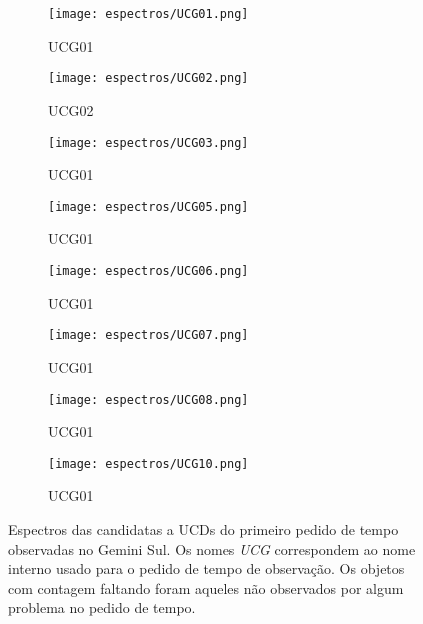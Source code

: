 \begin{figure}[!ht]
    \centering
    \captionsetup{justification=centering}
    \begin{subfigure}[b]{0.45\textwidth}
        \texttt{[image: espectros/UCG01.png]}
        \caption{UCG01}
    \end{subfigure}
    \begin{subfigure}[b]{0.45\textwidth}
        \texttt{[image: espectros/UCG02.png]}
        \caption{UCG02}
    \end{subfigure}
    \begin{subfigure}[b]{0.45\textwidth}
        \texttt{[image: espectros/UCG03.png]}
        \caption{UCG01}
    \end{subfigure}
    \begin{subfigure}[b]{0.45\textwidth}
        \texttt{[image: espectros/UCG05.png]}
        \caption{UCG01}
    \end{subfigure}
    \begin{subfigure}[b]{0.45\textwidth}
        \texttt{[image: espectros/UCG06.png]}
        \caption{UCG01}
    \end{subfigure}
    \begin{subfigure}[b]{0.45\textwidth}
        \texttt{[image: espectros/UCG07.png]}
        \caption{UCG01}
    \end{subfigure}
    \begin{subfigure}[b]{0.45\textwidth}
        \texttt{[image: espectros/UCG08.png]}
        \caption{UCG01}
    \end{subfigure}
    \begin{subfigure}[b]{0.45\textwidth}
        \texttt{[image: espectros/UCG10.png]}
        \caption{UCG01}
    \end{subfigure}
    \caption{Espectros das candidatas a UCDs do primeiro pedido de tempo observadas no Gemini Sul. Os nomes \textit{UCG} correspondem ao nome interno usado para o pedido de tempo de observação. Os objetos com contagem faltando foram aqueles não observados por algum problema no pedido de tempo.}
    \label{espectros_candidatas_1_p1}
\end{figure}


